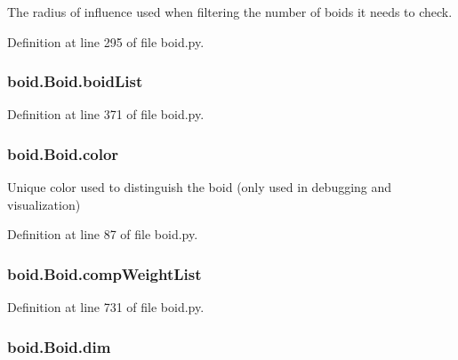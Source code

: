 The radius of influence used when filtering the number of boids it needs to check. 



Definition at line 295 of file boid.\-py.

\hypertarget{classboid_1_1Boid_a6d3a16e56bd3cc7efabf9ac7cae4ae16}{
\subsubsection[{boid\-List}]{\setlength{\rightskip}{0pt plus 5cm}boid.\-Boid.\-boid\-List}}\label{classboid_1_1Boid_a6d3a16e56bd3cc7efabf9ac7cae4ae16}


Definition at line 371 of file boid.\-py.

\hypertarget{classboid_1_1Boid_a6a2ca3d501e4b2b0d531d4d968487907}{
\subsubsection[{color}]{\setlength{\rightskip}{0pt plus 5cm}boid.\-Boid.\-color}}\label{classboid_1_1Boid_a6a2ca3d501e4b2b0d531d4d968487907}


Unique color used to distinguish the boid (only used in debugging and visualization) 



Definition at line 87 of file boid.\-py.

\hypertarget{classboid_1_1Boid_a811abb81b81e3b3e8e08e77a908ddb58}{
\subsubsection[{comp\-Weight\-List}]{\setlength{\rightskip}{0pt plus 5cm}boid.\-Boid.\-comp\-Weight\-List}}\label{classboid_1_1Boid_a811abb81b81e3b3e8e08e77a908ddb58}


Definition at line 731 of file boid.\-py.

\hypertarget{classboid_1_1Boid_a88a68e23e37b82bfe9862d7cd79542ad}{
\subsubsection[{dim}]{\setlength{\rightskip}{0pt plus 5cm}boid.\-Boid.\-dim}}\label{classboid_1_1Boid_a88a68e23e37b82bfe9862d7cd79542ad}


